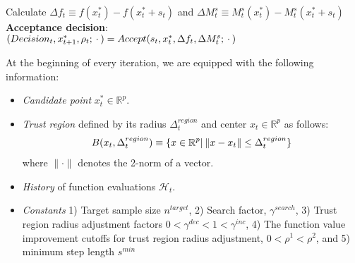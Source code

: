 \begin{algorithm}[H]
{        
         Calculate $\Delta f_t\equiv f(x_t^*) - f(x_t^*+s_t)$ and $\Delta M^{s}_t\equiv M_t^s(x_t^*) - M_t^s(x_t^*+s_t)$\\
         \nonl \textbf{Acceptance decision}:\\
         $(Decision_t,x_{t+1}^*,\rho_t;\hspace{0.2em}\cdot\hspace{0.2em}) =  Accept(s_t,x_t^{*},\Delta f_t,\Delta M_t^s;\hspace{0.2em}\cdot\hspace{0.2em})$\\
    }

    \end{algorithm}
\newpage
\restoregeometry

At the beginning of every iteration, we are equipped with the following information:
\begin{itemize}
    \item\textit{Candidate point} $x_t^*\in\mathbb{R}^p$.

\item \textit{Trust region} defined by its radius $\Delta_t^{region}$ and center $x_t\in\mathbb{R}^p$ as follows:
\begin{align}
    B(x_t,\Delta_t^{region})\equiv\{x\in\mathbb{R}^p|\hspace{0.2em}\lVert x-x_t\rVert\leq\Delta_t^{region}\}
    \label{eq:def-trustregion}
\end{align}
where $\lVert\cdot\rVert$ denotes the 2-norm of a vector.

\item \textit{History} of function evaluations $\mathcal{H}_t$.

\item \textit{Constants} 1) Target sample size $n^{target}$, 2) Search factor, $\gamma^{search}$, 3) Trust region radius adjustment factors $0<\gamma^{dec}<1<\gamma^{inc}$, 4) The function value improvement cutoffs for trust region radius adjustment, $0<\rho^1<\rho^2$, and 5) minimum step length $s^{min}$
\end{itemize}


